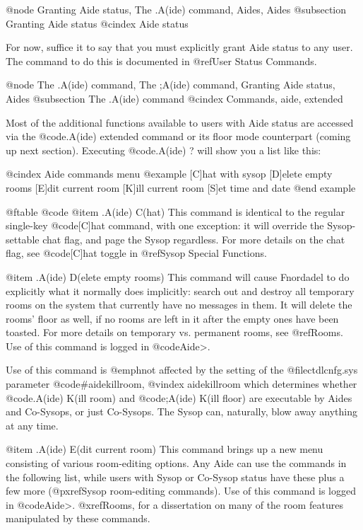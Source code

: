 @node Granting Aide status, The .A(ide) command, Aides, Aides
@subsection Granting Aide status
@cindex Aide status

For now, suffice it to say that you must explicitly grant
Aide status to any user.  The command to do this is documented in
@ref{User Status Commands}.

@node The .A(ide) command, The ;A(ide) command, Granting Aide status, Aides
@subsection The .A(ide) command
@cindex Commands, aide, extended

Most of the additional functions available to users with Aide
status are accessed via the @code{.A(ide)} extended command or its floor
mode counterpart (coming up next section).  Executing @code{.A(ide) ?} will
show you a list like this:

@cindex Aide commands menu
@example
[C]hat with sysop
[D]elete empty rooms
[E]dit current room
[K]ill current room
[S]et time and date
@end example

@ftable @code
@item .A(ide) C(hat)
This command is identical to the regular single-key
@code{[C]hat} command, with one exception: it will override the
Sysop-settable chat flag, and page the Sysop
regardless.  For more details on the chat flag, see @code{[C]hat toggle} in
@ref{Sysop Special Functions}.

@item .A(ide) D(elete empty rooms)
This command will cause Fnordadel to do explicitly
what it normally does implicitly: search out and destroy all
temporary rooms on the system that currently have no messages
in them.  It will delete the rooms' floor as well, if no rooms
are left in it after the empty ones have been toasted.  For more
details on temporary vs.  permanent rooms,
see @ref{Rooms}.  Use of this command is logged in @code{Aide>}.

Use of this command is @emph{not}
affected by the setting of the @file{ctdlcnfg.sys} parameter
@code{#aidekillroom},
@vindex aidekillroom
which determines whether @code{.A(ide) K(ill room)}
and @code{;A(ide) K(ill floor)} are executable by Aides and Co-Sysops,
or just Co-Sysops.  The Sysop can, naturally, blow away anything
at any time.

@item .A(ide) E(dit current room)
This command brings up a new menu consisting of
various room-editing options.  Any Aide can use the commands
in the following list, while users with Sysop or Co-Sysop status have
these plus a few more (@pxref{Sysop room-editing commands}).
Use of this command is logged in @code{Aide>}.  @xref{Rooms},
for a dissertation on many of the room features manipulated by these commands.

